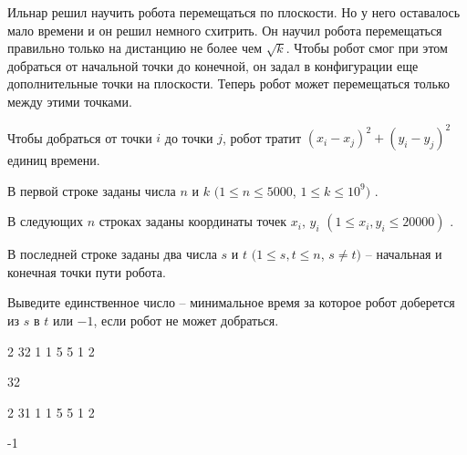 
Ильнар решил научить робота перемещаться по плоскости.
Но у него оставалось мало времени и он решил немного схитрить.
Он научил робота перемещаться правильно только на дистанцию не более чем $\sqrt k$.
Чтобы робот смог при этом добраться от начальной точки до конечной,
он задал в конфигурации еще дополнительные точки на плоскости.
Теперь робот может перемещаться только между этими точками.

Чтобы добраться от точки $i$ до точки $j$, робот тратит $(x_i - x_j)^2 + (y_i - y_j)^2$ единиц времени.


В первой строке заданы числа $n$ и $k$ $(1 \le n \le 5000$, $1 \le k \le 10^{9})$ .

В следующих $n$ строках заданы координаты точек $x_i$, $y_i$ $(1 \le x_{i}, y_{i} \le 20000)$ .

В последней строке заданы два числа $s$ и $t$  $(1 \le s, t \le n$, $s \ne t )$ -- начальная и конечная точки пути робота.

\outputfmtSection

Выведите единственное число -- минимальное время за которое робот доберется из $s$ в $t$ или $-1$, если робот не может добраться.

\exampleSection


\begin{myverbbox}[\small]{\vinput}
2 32
1 1
5 5
1 2
\end{myverbbox}
\begin{myverbbox}[\small]{\voutput}
32
\end{myverbbox}


\begin{myverbbox}[\small]{\vinput}
2 31
1 1
5 5
1 2
\end{myverbbox}
\begin{myverbbox}[\small]{\voutput}
-1
\end{myverbbox}

